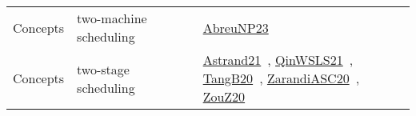 {\begin{longtable}{lp{3cm}>{\raggedright\arraybackslash}p{6cm}>{\raggedright\arraybackslash}p{6cm}>{\raggedright\arraybackslash}p{8cm}}
Concepts & two-machine scheduling &  &  & \href{../works/AbreuNP23.pdf}{AbreuNP23}~\cite{AbreuNP23}\\
Concepts & two-stage scheduling &  &  & \href{../works/Astrand21.pdf}{Astrand21}~\cite{Astrand21}, \href{../works/QinWSLS21.pdf}{QinWSLS21}~\cite{QinWSLS21}, \href{../works/TangB20.pdf}{TangB20}~\cite{TangB20}, \href{../works/ZarandiASC20.pdf}{ZarandiASC20}~\cite{ZarandiASC20}, \href{../works/ZouZ20.pdf}{ZouZ20}~\cite{ZouZ20}\\
\end{longtable}
}

